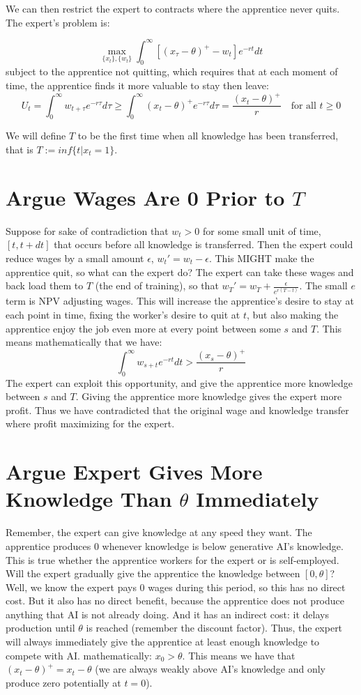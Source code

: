 \documentclass{article}
\begin{document}
We can then restrict the expert to contracts where the apprentice never quits. The expert's problem is:

\[\max_{\{x_t\},\{w_t\}}   \int_0^\infty [(x_\tau-\theta)^+-w_t ]e^{-rt} dt\]
subject to the apprentice not quitting, which requires that at each moment of time, the apprentice finds it more valuable to stay then leave:
\[ U_t = \int_0^\infty w_{t+\tau} e^{-r\tau}d\tau\geq \int_0^\infty (x_t-\theta)^+ e^{-r\tau}d\tau= \frac{(x_t-\theta)^+}{r} \quad \text{for all } t\geq 0 \]

We will define $T$ to be the first time when all knowledge has been transferred, that is $T:=inf\{t| x_t=1\}$.
\section{Argue Wages Are 0 Prior to $T$}

Suppose for sake of contradiction that $w_t>0$ for some small unit of time, $[t,t+dt]$ that occurs before all knowledge is transferred. Then the expert could reduce wages by a small amount $\epsilon$, $w_{t}'=w_t-\epsilon$. This MIGHT make the apprentice quit, so what can the expert do? The expert can take these wages and back load them to $T$ (the end of training), so that $w_T'=w_T+\frac{\epsilon}{e^{r(T-t)}}$. The small $e$ term is NPV adjusting wages. This will increase the apprentice's desire to stay at each point in time, fixing the worker's desire to quit at $t$, but also making the apprentice enjoy the job even more at every point between some $s$ and $T$. This means mathematically that we have:
\[\int_0^\infty w_{s+t} e^{-rt}dt> \frac{(x_s-\theta)^+}{r} \]
The expert can exploit this opportunity, and give the apprentice more knowledge between $s$ and $T$. Giving the apprentice more knowledge gives the expert more profit. Thus we have contradicted that the original wage and knowledge transfer where profit maximizing for the expert.

\section{Argue Expert Gives More Knowledge Than $\theta$ Immediately}

Remember, the expert can give knowledge at any speed they want. The apprentice produces 0 whenever knowledge is below generative AI's knowledge. This is true whether the apprentice workers for the expert or is self-employed. Will the expert gradually give the apprentice the knowledge between $[0, \theta]$? Well, we know the expert pays 0 wages during this period, so this has no direct cost. But it also has no direct benefit, because the apprentice does not produce anything that AI is not already doing. And it has an indirect cost: it delays production until $\theta$ is reached (remember the discount factor). Thus, the expert will always immediately give the apprentice at least enough knowledge to compete with AI. mathematically: $x_0> \theta$. This means we have that $(x_t-\theta)^+=x_t-\theta$ (we are always weakly above AI's knowledge and only produce zero potentially at $t=0$).
\end{document}
